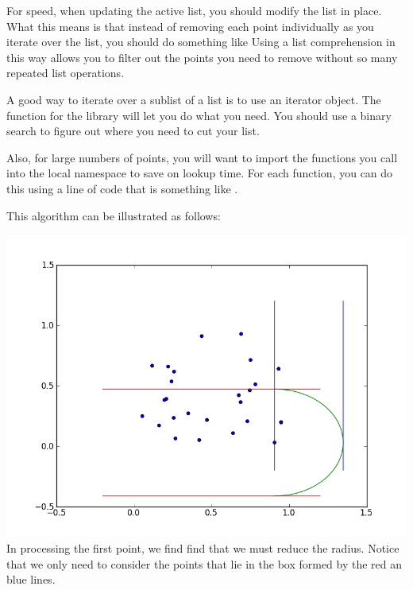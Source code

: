 For speed, when updating the active list, you should modify the list in place. 
What this means is that instead of removing each point individually as you iterate over the list, you should do something like  
Using a list comprehension in this way allows you to filter out the points you need to remove without so many repeated list operations. 

A good way to iterate over a sublist of a list is to use an iterator object. 
The function  for the  library will let you do what you need. 
You should use a binary search to figure out where you need to cut your list. 

Also, for large numbers of points, you will want to import the functions you call into the local namespace to save on lookup time. 
For each function, you can do this using a line of code that is something like . 

This algorithm can be illustrated as follows:


\includegraphics[width = \textwidth]{ptsweep1.png}
In processing the first point, we find find that we must reduce the radius. Notice that we only need to consider the points that lie in the box formed by the red an blue lines.


